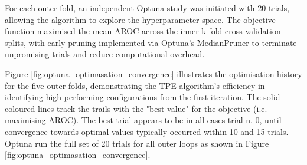 For each outer fold, an independent Optuna study was initiated with 20 trials, allowing the algorithm to explore the hyperparameter space. The objective function maximised the mean AROC across the inner k-fold cross-validation splits, with early pruning implemented via Optuna's MedianPruner to terminate unpromising trials and reduce computational overhead.

Figure \ref{fig:optuna_optimasation_convergence} illustrates the optimisation history for the five outer folds, demonstrating the TPE algorithm's efficiency in identifying high-performing configurations from the first iteration. The solid coloured lines track the trails with the "best value" for the objective (i.e. maximising AROC). The best trial appears to be in all cases trial n. 0, until convergence towards optimal values typically occurred within 10 and 15 trials. Optuna run the full set of 20 trials for all outer loops as shown in Figure \ref{fig:optuna_optimasation_convergence}.

